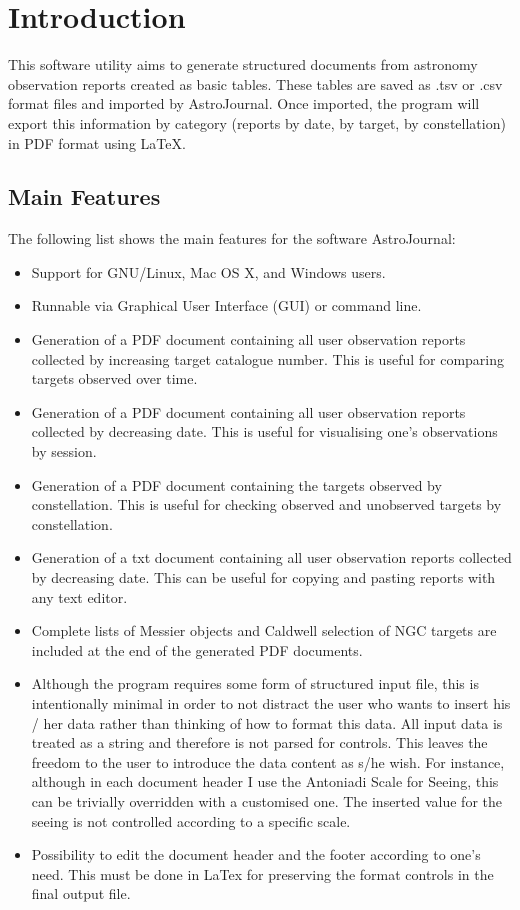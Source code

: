 \section{Introduction}
\label{sec:Introduction}
This software utility aims to generate structured documents from astronomy observation reports created as basic tables. These tables are saved as .tsv or .csv format files and imported by AstroJournal. Once imported, the program will export this information by category (reports by date, by target, by constellation) in PDF format using LaTeX.


\subsection{Main Features}
\label{subsec:Main Features}
The following list shows the main features for the software AstroJournal:
\begin{itemize}
 \item Support for GNU/Linux, Mac OS X, and Windows users.
 \item Runnable via Graphical User Interface (GUI) or command line.
 \item Generation of a PDF document containing all user observation reports collected by increasing target catalogue number. This is useful for comparing targets observed over time.
 \item Generation of a PDF document containing all user observation reports collected by decreasing date. This is useful for visualising one's observations by session.
 \item Generation of a PDF document containing the targets observed by constellation. This is useful for checking observed and unobserved targets by constellation.
 \item Generation of a txt document containing all user observation reports collected by decreasing date. This can be useful for copying and pasting reports with any text editor.
 \item Complete lists of Messier objects and Caldwell selection of NGC targets are included at the end of the generated PDF documents.
 \item Although the program requires some form of structured input file, this is intentionally minimal in order to not distract the user who wants to insert his / her data rather than thinking of how to format this data. All input data is treated as a string and therefore is not parsed for controls. This leaves the freedom to the user to introduce the data content as s/he wish. For instance, although in each document header I use the Antoniadi Scale for Seeing, this can be trivially overridden with a customised one. The inserted value for the seeing is not controlled according to a specific scale.
 \item Possibility to edit the document header and the footer according to one's need. This must be done in LaTex for preserving the format controls in the final output file.
\end{itemize}


